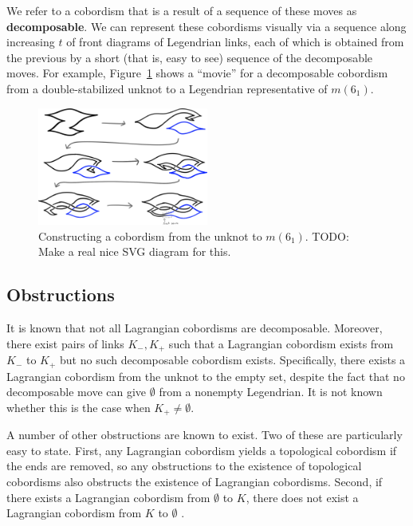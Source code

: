 We refer to a cobordism that is a result of a sequence of these moves as \textbf{decomposable}. We can represent these cobordisms visually via a sequence along increasing $t$ of front diagrams of Legendrian links, each of which is obtained from the previous by a short (that is, easy to see) sequence of the decomposable moves. For example, Figure~\ref{fig:cobordism-construction} shows a ``movie'' for a decomposable cobordism from a double-stabilized unknot to a Legendrian representative of $m(6_1)$.

\begin{figure}[ht!]
    \centering
    \includegraphics[width=0.5\textwidth]{images/cobordism-construction.png}
    \caption{Constructing a cobordism from the unknot to $m(6_1)$.
    TODO: Make a real nice SVG diagram for this.}%
    \label{fig:cobordism-construction}
\end{figure}

\subsection{Obstructions}

It is known that not all Lagrangian cobordisms are decomposable. Moreover, there exist pairs of links $K_-, K_+$ such that a Lagrangian cobordism exists from $K_-$ to $K_+$ but no such decomposable cobordism exists. Specifically, there exists a Lagrangian cobordism from the unknot to the empty set, despite the fact that no decomposable move can give $\emptyset$ from a nonempty Legendrian. It is not known whether this is the case when $K_+ \neq \emptyset$.

A number of other obstructions are known to exist. Two of these are particularly easy to state. First, any Lagrangian cobordism yields a topological cobordism if the ends are removed, so any obstructions to the existence of topological cobordisms also obstructs the existence of Lagrangian cobordisms. Second, if there exists a Lagrangian cobordism from $\emptyset$ to $K$, there does not exist a Lagrangian cobordism from $K$ to $\emptyset$ \cite{gromov}. 

